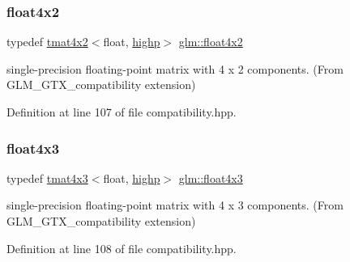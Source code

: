 \mbox{\label{group__gtx__compatibility_ga4cb477bf8e9167ab065aa70c7767e329}} 
\subsubsection{\texorpdfstring{float4x2}{float4x2}}
{\footnotesize\ttfamily typedef \mbox{\hyperlink{structglm_1_1tmat4x2}{tmat4x2}}$<$float, \mbox{\hyperlink{namespaceglm_a0f04f086094c747d227af4425893f545ac6f7eab42eacbb10d59a58e95e362074}{highp}}$>$ \mbox{\hyperlink{group__gtx__compatibility_ga4cb477bf8e9167ab065aa70c7767e329}{glm\+::float4x2}}}



single-\/precision floating-\/point matrix with 4 x 2 components. (From G\+L\+M\+\_\+\+G\+T\+X\+\_\+compatibility extension) 



Definition at line 107 of file compatibility.\+hpp.

\mbox{\label{group__gtx__compatibility_gaa0c1ca31e5e064223cc7cfc0344ac787}} 
\subsubsection{\texorpdfstring{float4x3}{float4x3}}
{\footnotesize\ttfamily typedef \mbox{\hyperlink{structglm_1_1tmat4x3}{tmat4x3}}$<$float, \mbox{\hyperlink{namespaceglm_a0f04f086094c747d227af4425893f545ac6f7eab42eacbb10d59a58e95e362074}{highp}}$>$ \mbox{\hyperlink{group__gtx__compatibility_gaa0c1ca31e5e064223cc7cfc0344ac787}{glm\+::float4x3}}}



single-\/precision floating-\/point matrix with 4 x 3 components. (From G\+L\+M\+\_\+\+G\+T\+X\+\_\+compatibility extension) 



Definition at line 108 of file compatibility.\+hpp.

\mbox{\label{group__gtx__compatibility_ga67688a2f2fc6386544d1a47a5d430467}} 
